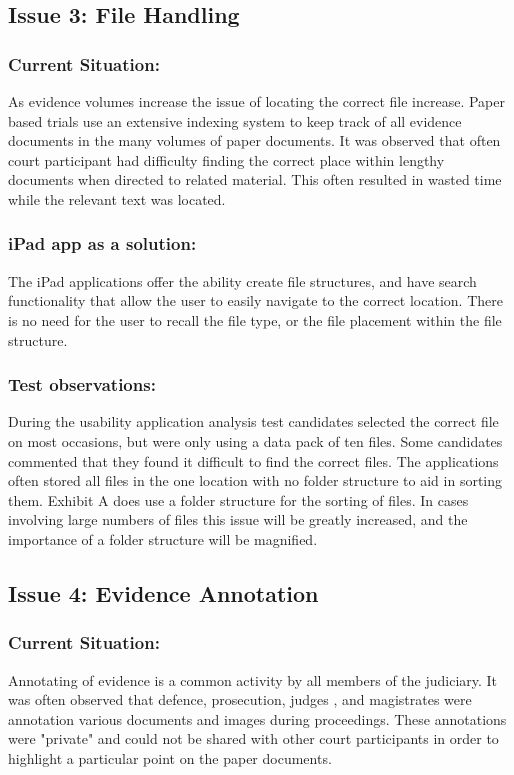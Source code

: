 \subsection{Issue 3: File Handling}
\subsubsection{Current Situation:}
As evidence volumes increase the issue of locating the correct file increase. Paper based trials use an extensive indexing system to keep track of all evidence documents in the many volumes of paper documents. It was observed that often court participant had difficulty finding the correct place within lengthy documents when directed to related material. This often resulted in wasted time while the relevant text was located.\\
\subsubsection{iPad app as a solution:}
The iPad applications offer the ability create file structures, and have search functionality that allow the user to easily navigate to the correct location. There is no need for the user to recall the file type, or the file placement within the file structure.
\\
\subsubsection{Test observations:}
During the usability application analysis test candidates selected the correct file on most occasions, but were only using a data pack of ten files. Some candidates commented that they found it difficult to find the correct files. The applications often stored all files in the one location with no folder structure to aid in sorting them. Exhibit A does use a folder structure for the sorting of files. In cases involving large numbers of files this issue will be greatly increased, and the importance of a folder structure will be magnified.\\


\subsection{Issue 4: Evidence Annotation}
\subsubsection{Current Situation:}
Annotating of evidence is a common activity by all members of the judiciary. It was often observed that defence, prosecution, judges , and magistrates were annotation various documents and images during proceedings. These annotations were "private" and could not be shared with other court participants in order to highlight a particular point on the paper documents.
\\

